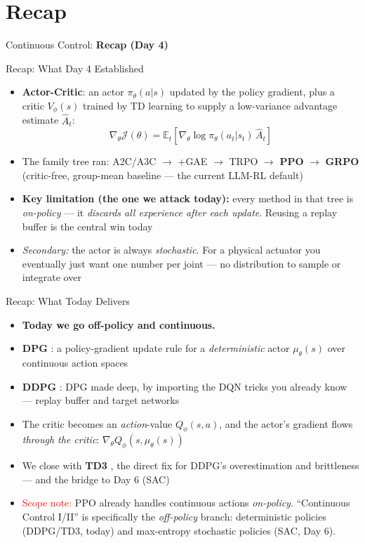 \section{Recap}
\begin{frame}{}
    \LARGE Continuous Control: \textbf{Recap (Day 4)}
\end{frame}

\begin{frame}{Recap: What Day 4 Established}
\begin{itemize}
    \item \textbf{Actor-Critic}: an actor $\pi_\theta(a|s)$ updated by the policy gradient, plus a critic $V_\phi(s)$ trained by TD learning to supply a low-variance advantage estimate $\hat{A}_t$:
    $$\nabla_\theta \mathcal{J}(\theta) = \mathbb{E}_t\!\left[ \nabla_\theta \log \pi_\theta(a_t|s_t)\, \hat{A}_t \right]$$
    \item The family tree ran: A2C/A3C $\rightarrow$ +GAE $\rightarrow$ TRPO $\rightarrow$ \textbf{PPO} $\rightarrow$ \textbf{GRPO} (critic-free, group-mean baseline --- the current LLM-RL default)
    \item \textbf{Key limitation (the one we attack today):} every method in that tree is \emph{on-policy} --- it \emph{discards all experience after each update}. Reusing a replay buffer is the central win today
    \item \emph{Secondary:} the actor is always \emph{stochastic}. For a physical actuator you eventually just want one number per joint --- no distribution to sample or integrate over
\end{itemize}
\end{frame}

\begin{frame}{Recap: What Today Delivers}
\begin{itemize}
    \item \textbf{Today we go off-policy and continuous.}
    \item \textbf{DPG} : a policy-gradient update rule for a \emph{deterministic} actor $\mu_\theta(s)$ over continuous action spaces
    \item \textbf{DDPG} : DPG made deep, by importing the DQN  tricks you already know --- replay buffer and target networks
    \item The critic becomes an \emph{action}-value $Q_\phi(s,a)$, and the actor's gradient flows \emph{through the critic}: $\nabla_\theta Q_\phi(s, \mu_\theta(s))$
    \item We close with \textbf{TD3} , the direct fix for DDPG's overestimation and brittleness --- and the bridge to Day 6 (SAC)
    \vspace{0.4em}
    \item[] \footnotesize \textcolor{red}{Scope note:} PPO already handles continuous actions \emph{on-policy}. ``Continuous Control I/II'' is specifically the \emph{off-policy} branch: deterministic policies (DDPG/TD3, today) and max-entropy stochastic policies (SAC, Day 6).
\end{itemize}
\end{frame}

